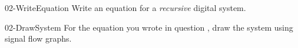 

\begin{question}{02-WriteEquation}  
  Write an equation for a \emph{recursive} digital system.
\end{question}


\begin{question}{02-DrawSystem} 
  For the equation you wrote in question , draw the system using signal flow graphs.
\end{question}

  